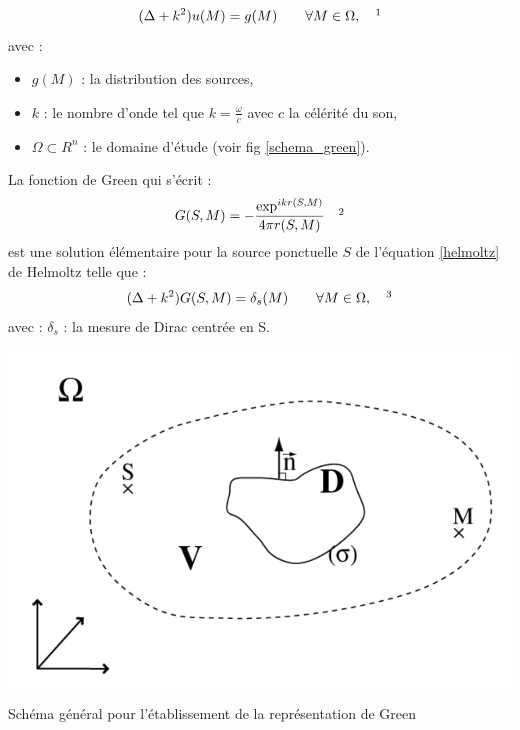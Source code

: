 \begin{equation} \label{helmoltz}
(\Delta + k^2)u(M) = g(M)	 	\qquad  \forall M  \in \Omega,
\ \ \ \footnotemark
\end{equation}
avec :
\begin{itemize}
\item $g(M)$ : la distribution des sources,
\item $k$ : le nombre d'onde tel que $k = \frac{\omega}{c}$ avec $c$ la célérité du son,
\item $\Omega  \subset R^n$ : le domaine d'étude (voir fig \ref{schema_green}).
\end{itemize}
La fonction de Green qui s'écrit :
\begin{equation}
G(S,M) = -\frac{\exp^{ikr(S,M)}}{4\pi r(S,M)}
\ \ \ \footnotemark
\end{equation}
est une solution élémentaire pour la source ponctuelle $S$ de l'équation \ref{helmoltz} de Helmoltz telle que :
\begin{equation} \label{green}
(\Delta + k^2)G(S,M) = \delta_s(M)	 	\qquad  \forall M  \in \Omega,
\ \ \ \footnotemark
\end{equation}
avec : $\delta_s$ : la mesure de \gls{Dirac} centrée en S.

\begin{figureth}
	\includegraphics[width=0.6\linewidth]{images/green}
	\caption[Schéma général pour l'établissement de la représentation de Green]{Schéma général pour l'établissement de la représentation de Green \footnotemark}
	\label{schema_green}
\end{figureth}


